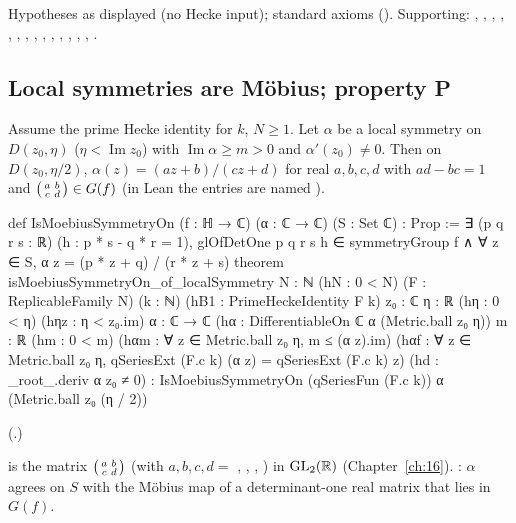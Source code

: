 \begin{status}Hypotheses as displayed (no Hecke input); standard axioms ().
Supporting: , , , ,
, , , ,
, , ,
, , ,
.\end{status}

\subsection{Local symmetries are M\"obius; property P}

\begin{theorem}\label{ch19:thm:moebius}
Assume the prime Hecke identity for $k$, $N\ge1$.  Let $\alpha$ be a local symmetry on $D(z_0,\eta)$ ($\eta<\operatorname{Im}z_0$) with
$\operatorname{Im}\alpha\ge m>0$ and $\alpha'(z_0)\ne0$.  Then on $D(z_0,\eta/2)$, $\alpha(z)=(az+b)/(cz+d)$ for real $a,b,c,d$ with $ad-bc=1$ and
$\left(\begin{smallmatrix}a&b\\c&d\end{smallmatrix}\right)\in G(f)$ (in Lean the entries are named ).
\end{theorem}
\begin{leancode}
def IsMoebiusSymmetryOn (f : ℍ → ℂ) (α : ℂ → ℂ) (S : Set ℂ) : Prop :=
  ∃ (p q r s : ℝ) (h : p * s - q * r = 1), glOfDetOne p q r s h ∈ symmetryGroup f ∧
    ∀ z ∈ S, α z = (p * z + q) / (r * z + s)
theorem isMoebiusSymmetryOn_of_localSymmetry {N : ℕ} (hN : 0 < N) (F : ReplicableFamily N)
    (k : ℕ) (hB1 : PrimeHeckeIdentity F k) {z₀ : ℂ} {η : ℝ} (hη : 0 < η) (hηz : η < z₀.im)
    {α : ℂ → ℂ} (hα : DifferentiableOn ℂ α (Metric.ball z₀ η)) {m : ℝ} (hm : 0 < m)
    (hαm : ∀ z ∈ Metric.ball z₀ η, m ≤ (α z).im)
    (hαf : ∀ z ∈ Metric.ball z₀ η, qSeriesExt (F.c k) (α z) = qSeriesExt (F.c k) z)
    (hd : _root_.deriv α z₀ ≠ 0) :
    IsMoebiusSymmetryOn (qSeriesFun (F.c k)) α (Metric.ball z₀ (η / 2))
\end{leancode}
(.)
\begin{dictionary}
 is the matrix $\left(\begin{smallmatrix}a&b\\c&d\end{smallmatrix}\right)$ (with $a,b,c,d=$ , , , ) in $\mathrm{GL}_2(\mathbb{R})$ (Chapter~\ref{ch:16}).
: $\alpha$ agrees on $S$ with the M\"obius map of a determinant-one real matrix that lies in $G(f)$.
\end{dictionary}
